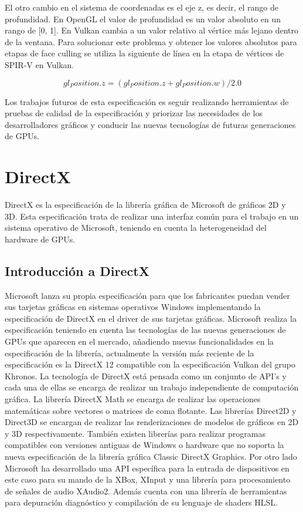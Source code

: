 \documentclass[a4paper, 17pt]{book}
\begin{document}
El otro cambio en el sistema de coordenadas es el eje z, es decir, el rango de profundidad. En OpenGL el valor de profundidad
es un valor absoluto en un rango de [0, 1]. En Vulkan cambia a un valor relativo al vértice más lejano dentro de la ventana.
Para solucionar este problema y obtener los valores absolutos para etapas de face culling se utiliza la siguiente de línea
en la etapa de vértices de SPIR-V en Vulkan. 

\begin{equation}
gl_Position.z = (gl_Position.z + gl_Position.w) / 2.0
\end{equation}

Los trabajos futuros de esta especificación es seguir realizando herramientas de pruebas de calidad de la especificación
y priorizar las necesidades de los desarrolladores gráficos y conducir las nuevas tecnologías de futuras
generaciones de GPUs.

\section{DirectX} 
\label{sec:DirectX}

DirectX es la especificación de la librería gráfica de Microsoft de gráficos 2D y 3D. Esta especificación trata de realizar
una interfaz común para el trabajo en un sistema operativo de Microsoft, teniendo en cuenta la heterogeneidad del hardware de GPUs.

\subsection{Introducción a DirectX} 
\label{subsec:IntroDirectX}

Microsoft lanza su propia especificación para que los fabricantes puedan vender sus tarjetas gráficas en sistemas operativos Windows
implementando la especificación de DirectX en el driver de sus tarjetas gráficas. Microsoft realiza la especificación teniendo en
cuenta las tecnologías de las nuevas generaciones de GPUs que aparecen en el mercado, añadiendo nuevas funcionalidades en la
especificación de la librería, actualmente la versión más reciente de la especificación es la DirectX 12 compatible con la
especificación Vulkan del grupo Khronos.
\bigbreak
La tecnología de DirectX está pensada como un conjunto de API’s y cada una de ellas se encarga de realizar un trabajo
independiente de computación gráfica. La librería DirectX Math se encarga de realizar las operaciones matemáticas
sobre vectores o matrices de coma flotante. Las librerías Direct2D y Direct3D se encargan de realizar las renderizaciones
de modelos de gráficos en 2D y 3D respectivamente. También existen librerías para realizar programas compatibles con
versiones antiguas de Windows o hardware que no soporta la nueva especificación de la librería gráfica Classic DirectX
Graphics. Por otro lado Microsoft ha desarrollado una API específica para la entrada de dispositivos en este caso para su
mando de la XBox, XInput y una librería para procesamiento de señales de audio XAudio2. Además cuenta con una librería
de herramientas para depuración diagnóstico y compilación de su lenguaje de shaders HLSL.
\end{document}
